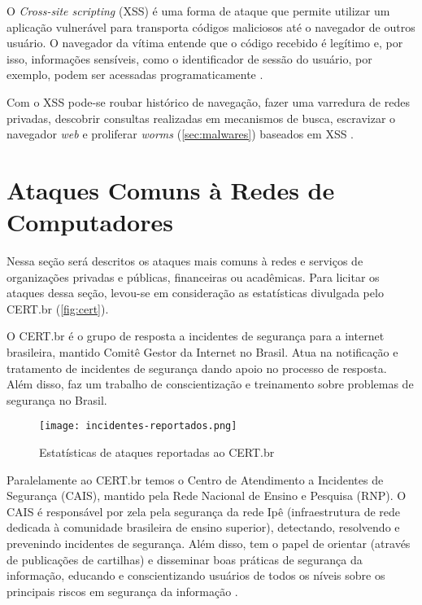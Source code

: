 O \textit{Cross-site scripting} (XSS) é uma forma de ataque que permite utilizar um aplicação vulnerável para transporta códigos maliciosos até o navegador de outros usuário. O navegador da vítima entende que o código recebido é legítimo e, por isso, informações sensíveis, como o identificador de sessão do usuário, por exemplo, podem ser acessadas programaticamente \cite{pentestweb:nelson}.

Com o XSS pode-se roubar histórico de navegação, fazer uma varredura de redes privadas, descobrir consultas realizadas em mecanismos de busca, escravizar o navegador \textit{web} e proliferar \textit{worms} (\autoref{sec:malwares}) baseados em XSS \cite{pentestweb:nelson}. 

\section{Ataques Comuns à Redes de Computadores} \label{sec:ataques-comuns}

Nessa seção será descritos os ataques mais comuns à redes e serviços de organizações privadas e públicas, financeiras ou acadêmicas. Para licitar os ataques dessa seção, levou-se em consideração as estatísticas divulgada pelo CERT.br (\autoref{fig:cert}).

O CERT.br é o grupo de resposta a incidentes de segurança para a internet brasileira, mantido Comitê Gestor da Internet no Brasil. Atua na notificação e tratamento de incidentes de segurança dando apoio no processo de resposta. Além disso, faz um trabalho de conscientização e treinamento sobre problemas de segurança no Brasil. 

\begin{figure}[htb]
 \centering
 \caption{Estatísticas de ataques reportadas ao CERT.br}
 \texttt{[image: incidentes-reportados.png]}
 \label{fig:cert}
\end{figure}

Paralelamente ao CERT.br temos o Centro de Atendimento a Incidentes de Segurança (CAIS), mantido pela Rede Nacional de Ensino e Pesquisa (RNP). O CAIS é responsável por zela pela segurança da rede Ipê (infraestrutura de rede dedicada à comunidade brasileira de ensino superior), detectando, resolvendo e prevenindo incidentes de segurança. Além disso, tem o papel de orientar (através de publicações de cartilhas) e disseminar boas práticas de segurança da informação, educando e conscientizando usuários de todos os níveis sobre os principais riscos em segurança da informação \cite{cais}.

